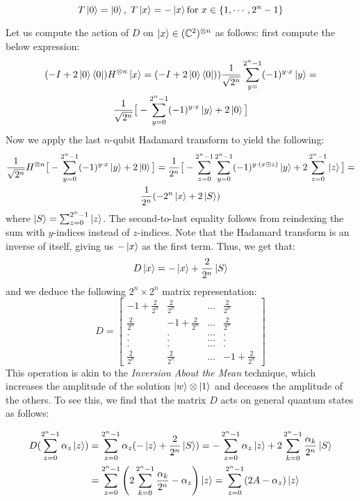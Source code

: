 \[ T\ket{0} = \ket{0}, \; T\ket{x} =-\ket{x} \text{for $  x \in \{1,\cdots, 2^n-1\}$}  \]

Let us compute the action of $D$ on $\ket{x} \in (\mathbb{C}^2)^{\otimes n}$ as follows: first compute the below expression:
%
\begin{gather}
  (-I + 2 \ket{0} \bra{0}) H^{\otimes n} \ket{x} = (-I + 2\ket{0}\bra{0})) \frac{1}{\sqrt{2^n}}\sum_{y=}^{2^n-1} (-1)^{y\cdot x}\ket{y} = \\
  \frac{1}{\sqrt{2^n}} \big[ -\sum_{y=0}^{2^n-1}(-1)^{y\cdot x}\ket{y} + 2\ket{0}\big]
\end{gather}
%
Now we apply the last $n$-qubit Hadamard transform to yield the following:
%
\begin{gather}
  \frac{1}{\sqrt{2^n}}H^{\otimes n} \big[-\sum_{y=0}^{2^n-1}(-1)^{y\cdot x}\ket{y} + 2\ket{0} \big] = \frac{1}{2^n}\big[-\sum_{z = 0}^{2^n-1} \sum_{y=0}^{2^n-1}(-1)^{y\cdot(x\oplus z)} \ket{y} + 2 \sum_{z = 0}^{2^n-1} \ket{z} \big] = \\
  \frac{1}{2^n}(-2^n\ket{x} + 2 \ket{S})
\end{gather}
%
where $\ket{S} = \sum_{z = 0}^{2^n-1} \ket{z}$.
%
The second-to-last equality follows from reindexing the sum with $y$-indices instead of $z$-indices. Note that the Hadamard transform is an inverse of itself, giving us $-\ket{x}$ as the first term.
%
Thus, we get that:
%
$$D\ket{x} = -\ket{x} + \frac{2}{2^n}\ket{S} $$
%
and we deduce the following $2^n\times 2^n$ matrix representation:
$$D = \left[ \begin{matrix}
        -1 + \frac{2}{2^n} & \frac{2}{2^n} & ... & \frac{2}{2^n} \\
        \frac{2}{2^n} & -1 + \frac{2}{2^n} & ... & \frac{2}{2^n} \\
        . & . &  ... & . \\
        . & . &  ... & . \\
        . & . &  ... & . \\
        \frac{2}{2^n} & \frac{2}{2^n} & ... & -1 + \frac{2}{2^n}
      \end{matrix} \right]
 $$
This operation is akin to the \emph{Inversion About the Mean} technique, which increases the amplitude of the solution $\ket{w} \otimes \ket{1}$ and deceases the amplitude of the others. To see this,  we find that the matrix $D$ acts on general quantum states as follows:

\begin{align*}
D(\sum_{z=0}^{2^n-1} \alpha_z\ket{z})
& = \sum_{z=0}^{2^n-1} \alpha_z (-\ket{z} + \frac{2}{2^n}\ket{S})
%
= -\sum_{z=0}^{2^n-1}\alpha_z \ket{z} + 2\sum_{k=0}^{2^n-1}\frac{\alpha_k}{2^n}\ket{S} \\
%
& = \sum_{z=0}^{2^n-1} \left( 2\sum_{k=0}^{2^n-1} \frac{\alpha_k}{2^n}   - \alpha_z \right)\ket{z}
%
 = \sum_{z=0}^{2^n-1} (2A -\alpha_z)\ket{z}
\end{align*}

